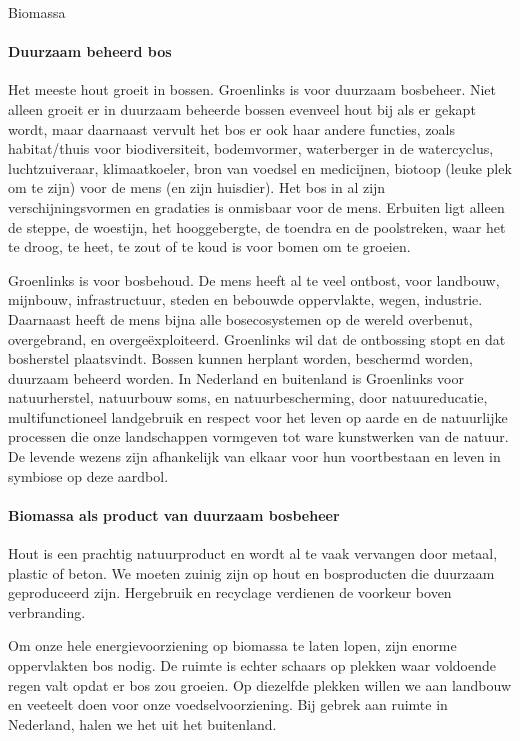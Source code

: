 \begin{voorstel}{Biomassa}
\begin{multicols*}{2}
\begin{overwegingen}
\paragraph{Duurzaam beheerd bos}
Het meeste hout groeit in bossen. Groenlinks is voor duurzaam bosbeheer. Niet alleen groeit er in duurzaam beheerde bossen evenveel hout bij als er gekapt wordt, maar daarnaast vervult het bos er ook haar andere functies, zoals habitat/thuis voor biodiversiteit, bodemvormer, waterberger in de watercyclus, luchtzuiveraar, klimaatkoeler, bron van voedsel en medicijnen, biotoop (leuke plek om te zijn) voor de mens (en zijn huisdier). Het bos in al zijn verschijningsvormen en gradaties is onmisbaar voor de mens. Erbuiten ligt alleen de steppe, de woestijn, het hooggebergte, de toendra en de poolstreken, waar het te droog, te heet, te zout of te koud is voor bomen om te groeien.

Groenlinks is voor bosbehoud. De mens heeft al te veel ontbost, voor landbouw, mijnbouw, infrastructuur, steden en bebouwde oppervlakte, wegen, industrie. Daarnaast heeft de mens bijna alle bosecosystemen op de wereld overbenut, overgebrand, en overgeëxploiteerd. Groenlinks wil dat de ontbossing stopt en dat bosherstel plaatsvindt. Bossen kunnen herplant worden, beschermd worden, duurzaam beheerd worden. In Nederland en buitenland is Groenlinks voor natuurherstel, natuurbouw soms, en natuurbescherming, door natuureducatie, multifunctioneel landgebruik en respect voor het leven op aarde en de natuurlijke processen die onze landschappen vormgeven tot ware kunstwerken van de natuur. De levende wezens zijn afhankelijk van elkaar voor hun voortbestaan en leven in symbiose op deze aardbol.

\paragraph{Biomassa als product van duurzaam bosbeheer}
Hout is een prachtig natuurproduct en wordt al te vaak vervangen door metaal, plastic of beton. We moeten zuinig zijn op hout en bosproducten die duurzaam geproduceerd zijn. Hergebruik en recyclage verdienen de voorkeur boven verbranding.

Om onze hele energievoorziening op biomassa te laten lopen, zijn enorme oppervlakten bos nodig. De ruimte is echter schaars op plekken waar voldoende regen valt opdat er bos zou groeien. Op diezelfde plekken willen we aan landbouw en veeteelt doen voor onze voedselvoorziening. Bij gebrek aan ruimte in Nederland, halen we het uit het buitenland.


\end{overwegingen}
\end{multicols*}
\end{voorstel}
